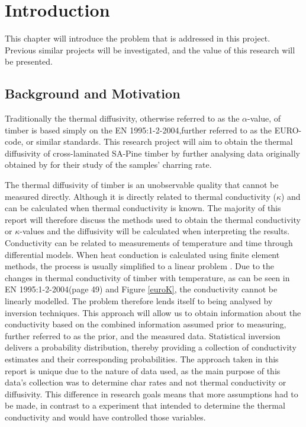 \chapter{Introduction} \label{introduction}
This chapter will introduce the problem that is addressed in this project. 
Previous similar projects will be investigated, and the value of this research will be presented.

\section{Background and Motivation}

Traditionally the thermal diffusivity, otherwise referred to as the $\alpha$-value, of timber is based simply on the EN 1995:1-2-2004,further referred to as the EURO-code, or similar standards.
This research project will aim to obtain the thermal diffusivity of cross-laminated SA-Pine timber by further analysing data originally obtained by \citeauthor{Westhuyzen:2020} for their study of the samples' charring rate.


The thermal diffusivity of timber is an unobservable quality that cannot be measured directly.
Although it is directly related to thermal conductivity ($\kappa$) and can be calculated when thermal conductivity is known. 
The majority of this report will therefore discuss the methods used to obtain the thermal conductivity or $\kappa$-values and the diffusivity will be calculated when interpreting the results. 
Conductivity can be related to measurements of temperature and time through differential models. 
When heat conduction is calculated using finite element methods, the process is usually simplified to a linear problem \citep{Fish:2007}. 
Due to the changes in thermal conductivity of timber with temperature, as can be seen in EN 1995:1-2-2004(page 49) and Figure \ref{euroK}, the conductivity cannot be linearly modelled. 
The problem therefore lends itself to being analysed by inversion techniques. 
This approach will allow us to obtain information about the conductivity based on the combined information assumed prior to measuring, further referred to as the prior, and the measured data. 
Statistical inversion delivers a probability distribution, thereby providing a collection of conductivity estimates and their corresponding probabilities.
The approach taken in this report is unique due to the nature of data used, as the main purpose of this data's collection was to determine char rates and not thermal conductivity or diffusivity.
This difference in research goals means that more assumptions had to be made, in contrast to a experiment that intended to determine the thermal conductivity and would have controlled those variables. 


